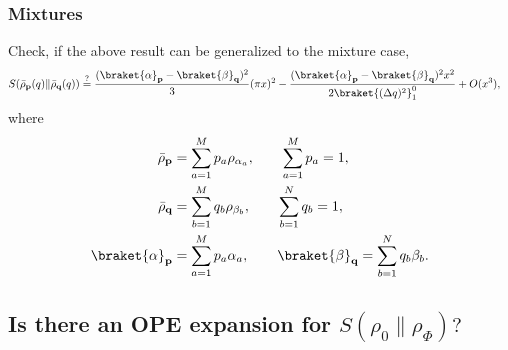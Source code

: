 \documentclass[11pt]{article}
\begin{document}
\subsubsection{Mixtures}
Check, if the above result can be generalized to the mixture case,
\begin{align}
    S(\bar\rho_\textbf{p}(q)\|\bar \rho_\textbf{q}(q)) &\overset{?}{=} \frac{( \braket{\alpha}_\textbf{p} - \braket{\beta}_\textbf{q}  )^2}{3}(\pi x)^2 - \frac{(\braket{\alpha}_\textbf{p} - \braket{\beta}_\textbf{q})^2x^2}{2\braket{(\Delta q)^2}_1^0}+ O(x^3),
\end{align}
where 
\begin{align}
    \bar{\rho}_\textbf{p} &= \sum_{a=1}^M p_a \rho_{\alpha_a}, \qquad \sum_{a=1}^M p_a = 1 ,\\
    \bar{\rho}_\textbf{q} &= \sum_{b=1}^M q_b \rho_{\beta_b}, \qquad \sum_{b=1}^N q_b = 1 ,\\
    \braket{\alpha}_\textbf{p} &= \sum_{a=1}^M p_a\alpha_a, \qquad \braket{\beta}_\textbf{q} = \sum_{b=1}^N q_b\beta_b.
\end{align}


\subsection{\texorpdfstring{Is there an OPE expansion for $S(\rho_0\|\rho_\Phi)?$}{Is there an OPE expansion for S(rho0 || rho Phi}}
\end{document}
